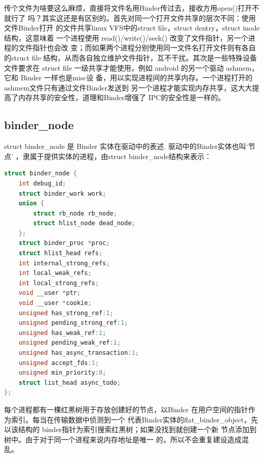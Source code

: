 \documentclass[a4paper,11pt]{article}
\begin{document}
传个文件为啥要这么麻烦，直接将文件名用Binder传过去，接收方用open()打开不就行了
吗？其实这还是有区别的。首先对同一个打开文件共享的层次不同：使用文件Binder打开
的文件共享linux VFS中的struct file，struct dentry，struct inode结构，这意味着
一个进程使用 read()/write()/seek() 改变了文件指针，另一个进程的文件指针也会改
变；而如果两个进程分别使用同一文件名打开文件则有各自的struct file
结构，从而各自独立维护文件指针，互不干扰。其次是一些特殊设备文件要求在
struct file 一级共享才能使用，例如 android 的另一个驱动 ashmem，它和 Binder 一样也是misc设
备，用以实现进程间的共享内存。一个进程打开的ashmem文件只有通过文件Binder发送到
另一个进程才能实现内存共享，这大大提高了内存共享的安全性，道理和Binder增强了
IPC的安全性是一样的。

\fi


\subsection{binder_node}
struct binder_node 是 Binder 实体在驱动中的表述. 驱动中的Binder实体也叫‘节点’
，隶属于提供实体的进程，由struct binder_node结构来表示：
\begin{lstlisting}[language=C,multicols=2,label=BinderNode]
struct binder_node {
    int debug_id;
    struct binder_work work;
    union {
        struct rb_node rb_node;
        struct hlist_node dead_node;
    };
    struct binder_proc *proc;
    struct hlist_head refs;
    int internal_strong_refs;
    int local_weak_refs;
    int local_strong_refs;
    void __user *ptr;
    void __user *cookie;
    unsigned has_strong_ref:1;
    unsigned pending_strong_ref:1;
    unsigned has_weak_ref:1;
    unsigned pending_weak_ref:1;
    unsigned has_async_transaction:1;
    unsigned accept_fds:1;
    unsigned min_priority:8;
    struct list_head async_todo;
};
\end{lstlisting}

    每个进程都有一棵红黑树用于存放创建好的节点，以Binder
    在用户空间的指针作为索引。每当在传输数据中侦测到一个
    代表Binder实体的flat_binder_object，先以该结构的
    binder指针为索引搜索红黑树；如果没找到就创建一个新
    节点添加到树中。由于对于同一个进程来说内存地址是唯一
    的，所以不会重复建设造成混乱。
\end{document}
